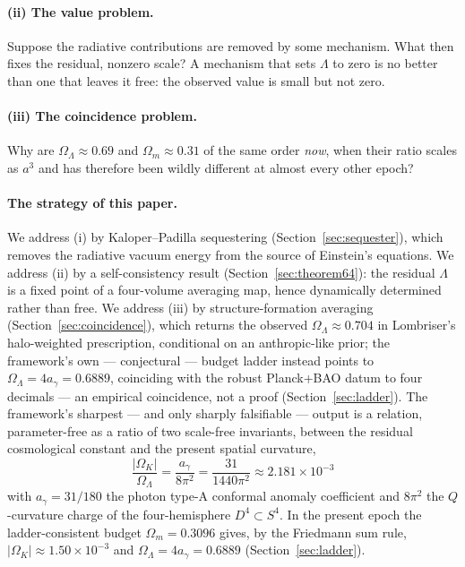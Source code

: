 \documentclass[11pt,a4paper]{article}
\theoremstyle{plain}
\theoremstyle{definition}
\theoremstyle{remark}
\newcommand{\Ok}{\Omega_K}
\newcommand{\OL}{\Omega_\Lambda}
\newcommand{\Om}{\Omega_m}
\newcommand{\ag}{a_\gamma}
\begin{document}
\paragraph{(ii) The value problem.} Suppose the radiative contributions are removed by some
mechanism. What then fixes the residual, nonzero scale? A mechanism that sets $\Lambda$ to zero
is no better than one that leaves it free: the observed value is small but not zero.

\paragraph{(iii) The coincidence problem.} Why are $\OL \approx 0.69$ and $\Om \approx 0.31$ of
the same order \emph{now}, when their ratio scales as $a^3$ and has therefore been wildly
different at almost every other epoch?

\paragraph{The strategy of this paper.} We address (i) by Kaloper--Padilla sequestering
(Section~\ref{sec:sequester}), which removes the radiative vacuum energy from the source of
Einstein's equations. We address (ii) by a self-consistency result
(Section~\ref{sec:theorem64}): the residual $\Lambda$ is a fixed point of a
four-volume averaging map, hence dynamically determined rather than free. We address (iii) by
structure-formation averaging (Section~\ref{sec:coincidence}), which returns the observed
$\OL \approx 0.704$ in Lombriser's halo-weighted prescription, conditional on an anthropic-like
prior; the framework's own --- conjectural --- budget ladder instead points
to $\OL = 4\ag = 0.6889$, coinciding with the robust Planck+BAO datum to four decimals --- an
empirical coincidence, not a proof (Section~\ref{sec:ladder}).
The framework's sharpest --- and only sharply falsifiable --- output is a relation, parameter-free as a ratio of two scale-free invariants,
between the residual cosmological constant and
the present spatial curvature,
\begin{equation}
\label{eq:central}
\boxed{\;\frac{|\Ok|}{\OL} = \frac{\ag}{8\pi^2} = \frac{31}{1440\pi^2} \approx 2.181\times 10^{-3}\;}
\end{equation}
with $\ag = 31/180$ the photon type-A conformal anomaly coefficient and $8\pi^2$ the
$Q$-curvature charge of the four-hemisphere $D^4 \subset S^4$. In the present epoch the ladder-consistent budget
$\Om = 0.3096$ gives, by the Friedmann sum rule, $|\Ok| \approx 1.50\times 10^{-3}$ and
$\OL = 4\ag = 0.6889$ (Section~\ref{sec:ladder}).
\end{document}
